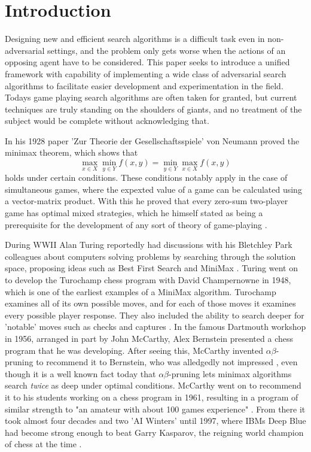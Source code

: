 \section{Introduction}

Designing new and efficient search algorithms is a difficult task even in non-adversarial settings, and the problem only gets worse when the actions of an opposing agent have to be considered. This paper seeks to introduce a unified framework with capability of implementing a wide class of adversarial search algorithms to facilitate easier development and experimentation in the field. Todays game playing search algorithms are often taken for granted, but current techniques are truly standing on the shoulders of giants, and no treatment of the subject would be complete without acknowledging that.

In his 1928 paper 'Zur Theorie der Gesellschaftsspiele' von Neumann proved the minimax theorem, which shows that
\begin{equation*}
    \max_{x\in X}\min_{y\in Y} f(x, y) = \min_{y\in Y}\max_{x\in X} f(x, y)   
\end{equation*}
holds under certain conditions. These conditions notably apply in the case of simultaneous games, where the expexted value of a game can be calculated using a vector-matrix product. With this he proved that every zero-sum two-player game has optimal mixed strategies, which he himself stated as being a prerequisite for the development of any sort of theory of game-playing \cite{Kjeldsen2001}. 

During WWII Alan Turing reportedly had discussions with his Bletchley Park colleagues about computers solving problems by searching through the solution space, proposing ideas such as Best First Search and MiniMax \cite{Copeland2006}. Turing went on to develop the Turochamp chess program with David Champernowne in 1948, which is one of the earliest examples of a MiniMax algorithm. Turochamp examines all of its own possible moves, and for each of those moves it examines every possible player response. They also included the ability to search deeper for 'notable' moves such as checks and captures \cite{Slomson2013}. In the famous Dartmouth workshop in 1956, arranged in part by John McCarthy, Alex Bernstein presented a chess program that he was developing. After seeing this, McCarthy invented $\alpha\beta$-pruning to recommend it to Bernstein, who was alledgedly not impressed \cite{McCarthy2006}, even though it is a well known fact today that $\alpha\beta$-pruning lets minimax algorithms search \textit{twice} as deep under optimal conditions. McCarthy went on to recommend it to his students working on a  chess program in 1961, resulting in a program of similar strength to "an amateur with about 100 games experience" \cite{Kotok2004}. From there it took almost four decades and two 'AI Winters' until 1997, where IBMs Deep Blue had become strong enough to beat Garry Kasparov, the reigning world champion of chess at the time \cite{Campbell2002}.

